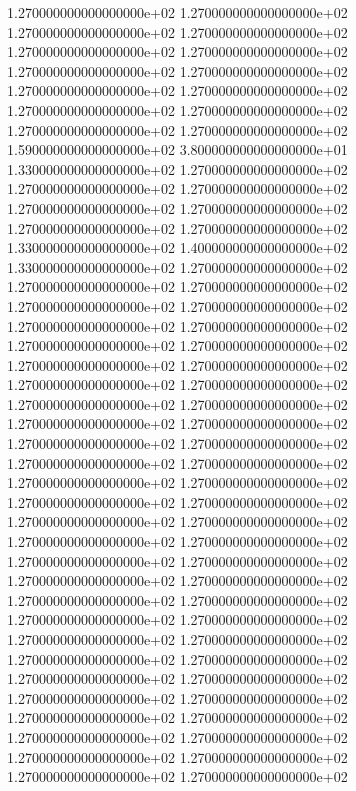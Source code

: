 1.270000000000000000e+02 1.270000000000000000e+02 1.270000000000000000e+02 1.270000000000000000e+02 1.270000000000000000e+02 1.270000000000000000e+02 1.270000000000000000e+02 1.270000000000000000e+02 1.270000000000000000e+02 1.270000000000000000e+02 1.270000000000000000e+02 1.270000000000000000e+02 1.270000000000000000e+02 1.270000000000000000e+02 1.590000000000000000e+02 3.800000000000000000e+01 1.330000000000000000e+02 1.270000000000000000e+02 1.270000000000000000e+02 1.270000000000000000e+02 1.270000000000000000e+02 1.270000000000000000e+02 1.270000000000000000e+02 1.270000000000000000e+02 1.330000000000000000e+02 1.400000000000000000e+02 1.330000000000000000e+02 1.270000000000000000e+02 1.270000000000000000e+02 1.270000000000000000e+02 1.270000000000000000e+02 1.270000000000000000e+02 1.270000000000000000e+02 1.270000000000000000e+02 1.270000000000000000e+02 1.270000000000000000e+02 1.270000000000000000e+02 1.270000000000000000e+02 1.270000000000000000e+02 1.270000000000000000e+02 1.270000000000000000e+02 1.270000000000000000e+02 1.270000000000000000e+02 1.270000000000000000e+02 1.270000000000000000e+02 1.270000000000000000e+02 1.270000000000000000e+02 1.270000000000000000e+02 1.270000000000000000e+02 1.270000000000000000e+02 1.270000000000000000e+02 1.270000000000000000e+02 1.270000000000000000e+02 1.270000000000000000e+02 1.270000000000000000e+02 1.270000000000000000e+02 1.270000000000000000e+02 1.270000000000000000e+02 1.270000000000000000e+02 1.270000000000000000e+02 1.270000000000000000e+02 1.270000000000000000e+02 1.270000000000000000e+02 1.270000000000000000e+02 1.270000000000000000e+02 1.270000000000000000e+02 1.270000000000000000e+02 1.270000000000000000e+02 1.270000000000000000e+02 1.270000000000000000e+02 1.270000000000000000e+02 1.270000000000000000e+02 1.270000000000000000e+02 1.270000000000000000e+02 1.270000000000000000e+02 1.270000000000000000e+02 1.270000000000000000e+02 1.270000000000000000e+02 1.270000000000000000e+02 1.270000000000000000e+02

